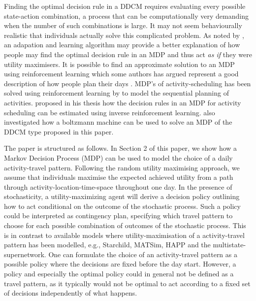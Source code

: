  Finding the optimal decision rule in a DDCM requires evaluating every possible state-action combination, a process that can be computationally very demanding when the number of such combinations is large. It may not seem behaviourally realistic that individuals actually solve this complicated problem. As noted by \citet{RustML88}, an adapation and learning algorithm may provide a better explanation of how people may find the optimal decision rule in an MDP and thus act \emph{as if} they were utility maximisers. It is possible to find an approximate solution to an MDP using reinforcement learning which some authors has argued represent a good description of how people plan their days \citep[see, e.g.,][]{arentze2004learning}. MDP's of activity-scheduling has been solved using reinforcement learning by \citet{vanhusel09} to model the sequential planning of activities. \citet{Feygin18} proposed in his thesis how the decision rules in an MDP for activity scheduling can be estimated using inverse reinforcement learning. \citet{karlstromScalingUp2009} also investigated how a boltzmann machine can be used to solve an MDP of the DDCM type proposed in this paper. 
 
The paper is structured as follows.
In Section 2 of this paper, we show how a Markov Decision Process (MDP) can be used to model the choice of a daily activity-travel pattern. Following the random utility maximising approach, we assume that individuals maximise the expected achieved utility from a path through activity-location-time-space throughout one day. In the presence of stochasticity, a utility-maximizing agent will derive a decision policy outlining how to act conditional on the outcome of the stochastic process. Such a policy could be interpreted as contingency plan, specifying which travel pattern to choose for each possible combination of outcomes of the stochastic process. This is in contrast to available models where utility-maximisation of a activity-travel pattern has been modelled, e.g., Starchild, MATSim, HAPP and the multistate-supernetwork. One can formulate the choice of an activity-travel pattern as a possible policy where the decisions are fixed before the day start. However, a policy and especially the optimal policy could in general not be defined as a travel pattern, as it typically would not be optimal to act according to a fixed set of decisions independently of what happens. 


